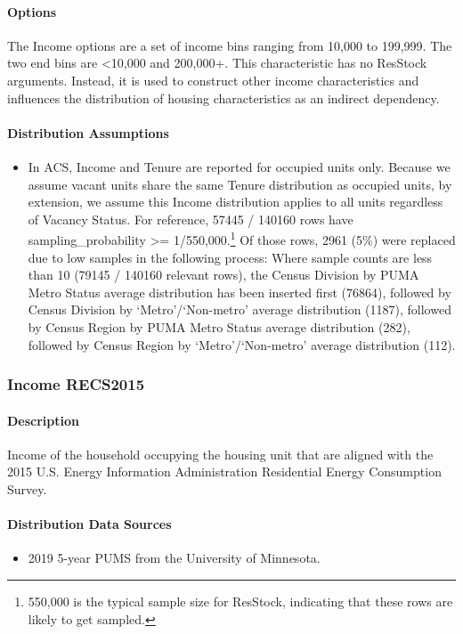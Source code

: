 \paragraph{Options}
The Income options are a set of income bins ranging from 10,000 to 199,999. The two end bins are <10,000 and 200,000+. This characteristic has no ResStock arguments. Instead, it is used to construct other income characteristics and influences the distribution of housing characteristics as an indirect dependency.

\paragraph{Distribution Assumptions}
\begin{itemize}
\item
  In ACS, Income and Tenure are reported for occupied units only.
  Because we assume vacant units share the same Tenure distribution as
  occupied units, by extension, we assume this Income distribution
  applies to all units regardless of Vacancy Status. For reference,
  57445 / 140160 rows have sampling\_probability \textgreater= 1/550,000.\footnote{550,000 is the typical sample size for ResStock, indicating that these rows are likely to get sampled.}
  Of those rows, 2961 (5\%) were replaced due to low samples in the
  following process: Where sample counts are less than 10 (79145 /
  140160 relevant rows), the Census Division by PUMA Metro Status
  average distribution has been inserted first (76864), followed by
  Census Division by
  `Metro'/`Non-metro'
  average distribution (1187), followed by Census Region by PUMA Metro
  Status average distribution (282), followed by Census Region by
  `Metro'/`Non-metro'
  average distribution (112).
\end{itemize}

\subsubsection{Income RECS2015}\label{income_recs2015}
\paragraph{Description}
Income of the household occupying the housing unit that are aligned
with the 2015 U.S. Energy Information Administration Residential Energy
Consumption Survey.

\paragraph{Distribution Data Sources}
\begin{itemize}
\item
  2019 5-year PUMS from the University of Minnesota.
\end{itemize}

